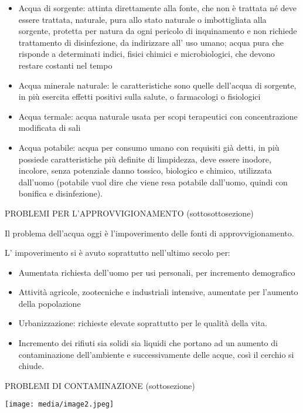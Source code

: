 \documentclass[]{article}
\begin{document}
\begin{itemize}
\item
  Acqua di sorgente: attinta direttamente alla fonte, che non è trattata
  né deve essere trattata, naturale, pura allo stato naturale o
  imbottigliata alla sorgente, protetta per natura da ogni pericolo di
  inquinamento e non richiede trattamento di disinfezione, da
  indirizzare all' uso umano; acqua pura che risponde a determinati
  indici, fisici chimici e microbiologici, che devono restare costanti
  nel tempo
\item
  Acqua minerale naturale: le caratteristiche sono quelle dell'acqua di
  sorgente, in più esercita effetti positivi sulla salute, o farmacologi
  o fisiologici
\item
  Acqua termale: acqua naturale usata per scopi terapeutici con
  concentrazione modificata di sali
\item
  Acqua potabile: acqua per consumo umano con requisiti già detti, in
  più possiede caratteristiche più definite di limpidezza, deve essere
  inodore, incolore, senza potenziale danno tossico, biologico e
  chimico, utilizzata dall'uomo (potabile vuol dire che viene resa
  potabile dall'uomo, quindi con bonifica e disinfezione).
\end{itemize}

PROBLEMI PER L'APPROVVIGIONAMENTO (sottosottosezione)

Il problema dell'acqua oggi è l'impoverimento delle fonti di
approvvigionamento.

L' impoverimento si è avuto soprattutto nell'ultimo secolo per:

\begin{itemize}
\item
  Aumentata richiesta dell'uomo per usi personali, per incremento
  demografico
\item
  Attività agricole, zootecniche e industriali intensive, aumentate per
  l'aumento della popolazione
\item
  Urbanizzazione: richieste elevate soprattutto per le qualità della
  vita.
\item
  Incremento dei rifiuti sia solidi sia liquidi che portano ad un
  aumento di contaminazione dell'ambiente e successivamente delle acque,
  così il cerchio si chiude.
\end{itemize}

PROBLEMI DI CONTAMINAZIONE (sottosezione)

\texttt{[image: media/image2.jpeg]}
\end{document}
